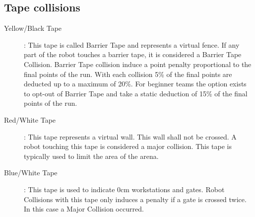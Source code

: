 \subsection{Tape collisions}

\begin{description}
  \item[Yellow/Black Tape]: This tape is called Barrier Tape and represents a virtual fence. If any part of the robot
  touches a barrier tape, it is considered a Barrier Tape Collision. Barrier Tape collision induce a point penalty
  proportional to the final points of the run. With each collision 5\% of the final points are deducted up to a maximum
  of 20\%. For beginner teams the option exists to opt-out of Barrier Tape and take a static deduction of 15\% of the
  final points of the run.
  \item[Red/White Tape]: This tape represents a virtual wall. This wall shall not be crossed. A robot touching this
  tape is considered a major collision. This tape is typically used to limit the area of the arena.
  \item[Blue/White Tape]: This tape is used to indicate 0cm workstations and gates. Robot Collisions with this tape
  only induces a penalty if a gate is crossed twice. In this case a Major Collision occurred.
\end{description}

